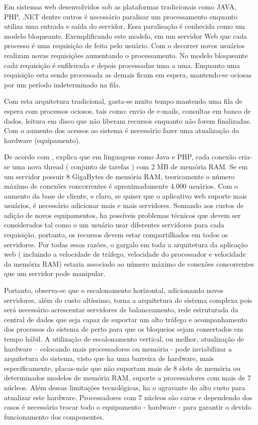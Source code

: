   Em sistemas web desenvolvidos sob as plataformas tradicionais como JAVA, PHP, .NET dentre outros 
  é necessário paralisar um processamento enquanto utiliza uma entrada e saída do servidor. 
  Essa paralisação é conhecida como um modelo bloqueante. Exemplificando este modelo, em um servidor Web 
  que cada processo é uma requisição de feita pelo usuário. Com o decorrer novos usuários realizam novas 
  requisições aumentando o processamento. No modelo bloqueante cada requisição é enfileirada e depois 
  processadas uma a uma. Enquanto uma requisição esta sendo processada as demais ficam em espera, 
  mantendo-se ociosas por um período indeterminado na fila.\cite{Pereira:2013}
  
  Com esta arquitetura tradicional, gasta-se muito tempo mantendo uma fila de espera com processos ociosos,
  tais como: envio de e-mails, consultas em banco de dados, leitura em disco que não liberam recursos enquanto
  não forem finalizadas. Com o aumento dos acessos ao sistema é necessário fazer uma atualização
  do hardware (equipamento).\cite{Pereira:2013}
  
  De acordo com , explica que em linguagens como Java e PHP, cada conexão cria-se uma 
  nova thread ( conjunto de tarefas ) com 2 MB de memória RAM. Se em um servidor possuir 8 GigaBytes de memória RAM, 
  teoricamente o número máximo de conexões concorrentes é aproximadamente 4.000 usuários. 
  Com o aumento da base de cliente, e claro, se quiser que o aplicativo web suporte mais usuários, é necessário 
  adicionar mais e mais servidores. Somando aos custos de adição de novos equipamentos, ha possíveis problemas 
  técnicos que devem ser considerados tal como o um usuário usar diferentes servidores para cada requisição, portanto, 
  os recursos devem estar compartilhados em todos os servidores. Por todas essas razões, o gargalo em toda a arquitetura 
  da aplicação web ( incluindo a velocidade de tráfego, velocidade do processador e velocidade da memória RAM) 
  estaria associado ao número máximo de conexões concorrentes que um servidor pode manipular.
  
  Portanto, observa-se que o escalonamento horizontal, adicionando novos servidores, além do custo altíssimo, 
  torna a arquitetura do sistema complexa pois será necessário acrescentar servidores de balanceamento, 
  rede estruturada da central de dados que seja capaz de suportar um alto tráfego e acompanhamento dos processos 
  do sistema de perto para que os bloqueios sejam consertados em tempo hábil. A utilização de escalonamento vertical, 
  ou melhor, atualização de hardware – colocando mais processadores ou memória - pode inviabilizar a arquitetura do 
  sistema, visto que ha uma barreira de hardware, mais especificamente, placas-mãe que não suportam mais de 8 slots 
  de memória ou determinados modelos de memória RAM, suporte a processadores com mais de 7 núcleos. 
  Além dessas limitações tecnológicas, ha o agravante do alto custo para atualizar este hardware. 
  Processadores com 7 núcleos são caros e dependendo dos casos é necessário trocar todo o equipamento - hardware - 
  para garantir o devido funcionamento dos componentes.
  
